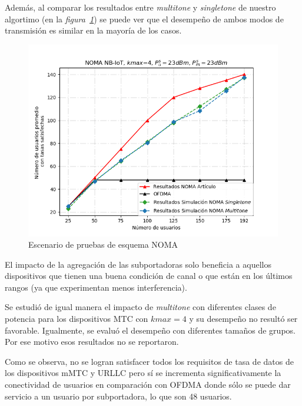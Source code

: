 Además, al comparar los resultados entre \textit{multitone} y \textit{singletone} de nuestro algortimo (en la \textit{figura~\ref{fig:ResultsNOMA}}) se puede ver que el desempeño de ambos modos de transmisión es similar en la mayoría de los casos.\newline

\begin{figure}[th]
    \centering
    \includegraphics[scale=.7]{Figures/NOMA_results_comparation.png}
    \decoRule
    \caption[Escenario de pruebas de esquema NOMA]{Escenario de pruebas de esquema NOMA}
    \label{fig:ResultsNOMA}
\end{figure}

El impacto de la agregación de las subportadoras solo beneficia a aquellos dispositivos que tienen una buena condición de canal o que están en los últimos rangos (ya que experimentan menos interferencia). \newline

Se estudió de igual manera el impacto de \textit{multitone} con diferentes clases de potencia para los dispositivos MTC con $kmax = 4$ y su desempeño no resultó ser favorable. Igualmente, se evaluó el desempeño con diferentes tamaños de grupos. Por ese motivo esos resultados no se reportaron.\newline

Como se observa, no se logran satisfacer todos los requisitos de tasa de datos de los dispositivos mMTC y URLLC pero sí se incrementa significativamente la conectividad de usuarios en comparación con OFDMA donde sólo se puede dar servicio a un usuario por subportadora, lo que son 48 usuarios.\newline

